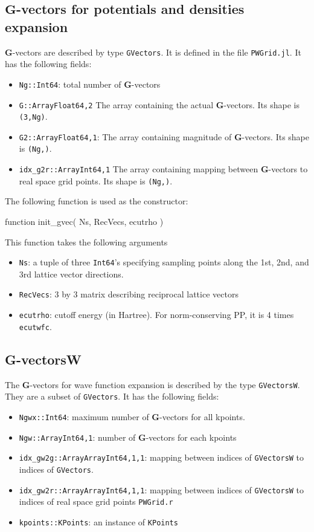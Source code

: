 \documentclass[a4paper,12pt]{article}
\newcommand{\jlcode}[1]{\texttt{#1}}
\begin{document}
\subsection{$\mathbf{G}$-vectors for potentials and densities expansion}

$\mathbf{G}$-vectors are described by type \jlcode{GVectors}.
It is defined in the file \jlcode{PWGrid.jl}. It has the following fields:
\begin{itemize}
%
\item \jlcode{Ng::Int64}: total number of $\mathbf{G}$-vectors
%
\item \jlcode{G::Array{Float64,2}} The array containing the actual $\mathbf{G}$-vectors.
   Its shape is \jlcode{(3,Ng)}.
%
\item \jlcode{G2::Array{Float64,1}}: The array containing magnitude of $\mathbf{G}$-vectors.
  Its shape is \jlcode{(Ng,)}.
%
\item \jlcode{idx_g2r::Array{Int64,1}} The array containing mapping between $\mathbf{G}$-vectors
  to real space grid points. Its shape is \jlcode{(Ng,)}.
%
\end{itemize}

The following function is used as the constructor:

\begin{juliacode}
function init_gvec( Ns, RecVecs, ecutrho )
\end{juliacode}
%
This function takes the following arguments
%
\begin{itemize}
%
\item \jlcode{Ns}: a tuple of three \jlcode{Int64}'s specifying sampling points
  along the 1st, 2nd, and 3rd lattice vector directions.
%
\item \jlcode{RecVecs}: 3 by 3 matrix describing reciprocal lattice vectors
%
\item \jlcode{ecutrho}: cutoff energy (in Hartree). For norm-conserving PP,
  it is 4 times \jlcode{ecutwfc}.
\end{itemize}


\subsection{G-vectorsW}

The $\mathbf{G}$-vectors for wave function expansion is described by
the type \jlcode{GVectorsW}.
They are a subset of \jlcode{GVectors}. It has the following fields:
\begin{itemize}
%
\item \jlcode{Ngwx::Int64}: maximum number of $\mathbf{G}$-vectors for all kpoints.
%
\item \jlcode{Ngw::Array{Int64,1}}: number of $\mathbf{G}$-vectors for each kpoints
%
\item \jlcode{idx_gw2g::Array{Array{Int64,1},1}}: mapping between indices of
  \jlcode{GVectorsW} to indices of \jlcode{GVectors}.
%
\item \jlcode{idx_gw2r::Array{Array{Int64,1},1}}: mapping between indices of
  \jlcode{GVectorsW}
  to indices of real space grid points \jlcode{PWGrid.r}
%
\item \jlcode{kpoints::KPoints}: an instance of \jlcode{KPoints}
%
\end{itemize}
\end{document}
